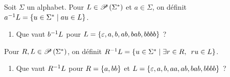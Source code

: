 \begin{corr}
\end{corr}

\begin{exo}
Soit \(\Sigma\) un alphabet. Pour \(L\in\mathscr{P}\left(\Sigma^{*}\right)\) et \(a\in\Sigma\), on définit \(a^{-1} L=\left\lbrace u\in\Sigma^{*}\;\middle|\; au\in L\right\rbrace\).

\begin{enumerate}[series=ex1.10]
    \item Que vaut \(b^{-1} L\) pour \(L=\left\lbrace\varepsilon,a,b,ab,bab,bbbb\right\rbrace\) ?
\end{enumerate}

Pour \(R,L\in\mathscr{P}\left(\Sigma^{*}\right)\), on définit \(R\inv L=\accol{u\in\Sigma\etoile\tq\quantifs{\exists r\in R}ru\in L}\).

\begin{enumerate}[resume=ex1.10]
    \item Que vaut \(R^{-1} L\) pour \(R=\left\lbrace a,bb\right\rbrace\) et \(L=\left\lbrace\varepsilon,a,b,aa,ab,bab,bbbb\right\rbrace\) ?
\end{enumerate}
\end{exo}

\begin{corr}
\end{corr}
